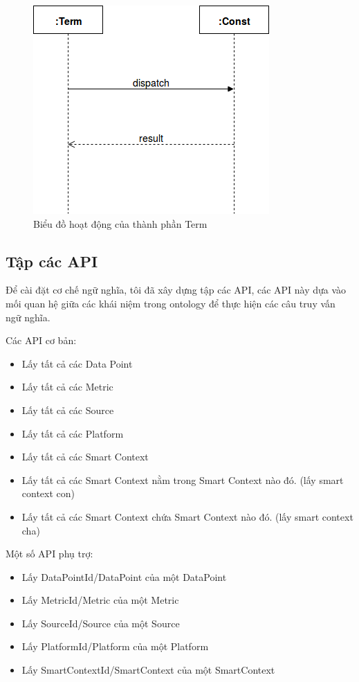 \begin{figure}[h!]
	\center
	\includegraphics[scale=0.4]{image/language_diagram-term}	
	\caption{Biểu đồ hoạt động của thành phần Term}
\end{figure}


\subsection{Tập các API}
Để cài đặt cơ chế ngữ nghĩa, tôi đã xây dựng tập các API, các API này dựa vào mối quan hệ giữa các khái niệm trong ontology để thực hiện các câu truy vấn ngữ nghĩa. 

Các API cơ bản:

\begin{itemize}
	\item Lấy tất cả các Data Point
	\item Lấy tất cả các Metric
	\item Lấy tất cả các Source
	\item Lấy tất cả các Platform
	\item Lấy tất cả các Smart Context
	\item Lấy tất cả các Smart Context nằm trong Smart Context nào đó. (lấy smart context con)
	\item Lấy tất cả các Smart Context chứa Smart Context nào đó. (lấy smart context cha)
\end{itemize}

Một số API phụ trợ:
\begin{itemize}
	\item Lấy DataPointId/DataPoint của một DataPoint
	\item Lấy MetricId/Metric của một Metric
	\item Lấy SourceId/Source của một Source
	\item Lấy PlatformId/Platform của một Platform
	\item Lấy SmartContextId/SmartContext của một SmartContext
\end{itemize}


